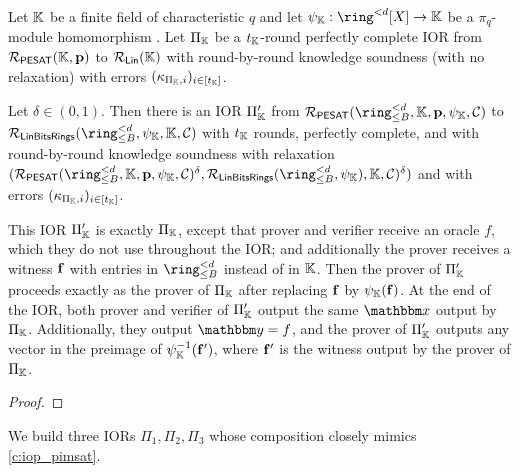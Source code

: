 \documentclass[11pt,letterpaper,usenames,dvipsnames]{article}
\begin{document}
\begin{lemma}\label{l:lift_pesat_to_encodings}
Let $\mathbb{K}$ be a finite field of characteristic $q$ and let $\psi_\KK:\ringdegbound{\moduledegree}[X]\to \KK$ be a $\pi_q$-module homomorphism . Let $\Pi_{\mathbb{K}}$ be a $t_{\mathbb{K}}$-round perfectly complete IOR from $\mathcal{R}_{\mathsf{PESAT}}(\mathbb{K},\mathbf{p})$ to $\mathcal{R}_{\mathsf{Lin}}(\mathbb{K})$ with round-by-round knowledge soundness (with no relaxation) with errors $(\kappa_{\Pi_{\mathbb{K}}, i})_{i\in [t_{\mathbb{K}}]}$. 

Let $\delta\in (0,1)$. Then there is an IOR $\Pi_{\mathbb{K}}'$ from $\PESAT(\ringtwobounds{B}{\moduledegree}, \KK,\pp,\psi_\KK, \cC)$ to $\LinModFieldBin(\ringtwobounds{B}{\moduledegree},\psi_\KK, \KK,\cC)$  with $t_{\mathbb{K}}$ rounds, perfectly complete, and with round-by-round knowledge soundness with relaxation $(\PESAT(\ringtwobounds{B}{\moduledegree}, \KK,\pp,\psi_\KK, \cC)^\delta,\LinModFieldBin(\ringtwobounds{B}{\moduledegree},\psi_\KK), \KK, \cC)^\delta)$ and with errors $(\kappa_{\Pi_{\mathbb{K}}, i})_{i\in [t_{\mathbb{K}}]}$.  

 This IOR $\Pi_{\mathbb{K}}'$ is exactly $\Pi_{\mathbb{K}}$, except that prover and verifier receive an oracle $f$, which they do not use throughout the IOR; and additionally the prover receives a witness $\mathbf{f}$ with entries in $\ringtwobounds{B}{\moduledegree}$ instead of in $\mathbb{K}$. Then the prover of $\Pi_{\mathbb{K}}'$ proceeds exactly as the prover of $\Pi_{\mathbb{K}}$ after replacing $\mathbf{f}$ by $\psi_{\mathbb{K}}(\mathbf{f})$. At the end of the IOR, both prover and verifier of $\Pi_{\mathbb{K}}'$ output the same  $\inp$ output by $\Pi_{\mathbb{K}}$. Additionally, they output $\oracle=f$, and the prover of $\Pi_{\mathbb{K}}'$ outputs any vector in the preimage of $\psi_{\mathbb{K}}^{-1}(\mathbf{f}')$, where $\mathbf{f}'$ is the witness output by the prover of $\Pi_{\mathbb{K}}$. 
\end{lemma}
\begin{proof}
\end{proof}

\bigskip

\noindent We build  three IORs $\Pi_1,\Pi_2,\Pi_3$ whose composition closely mimics \cref{c:iop_pimsat}. 



\end{document}
